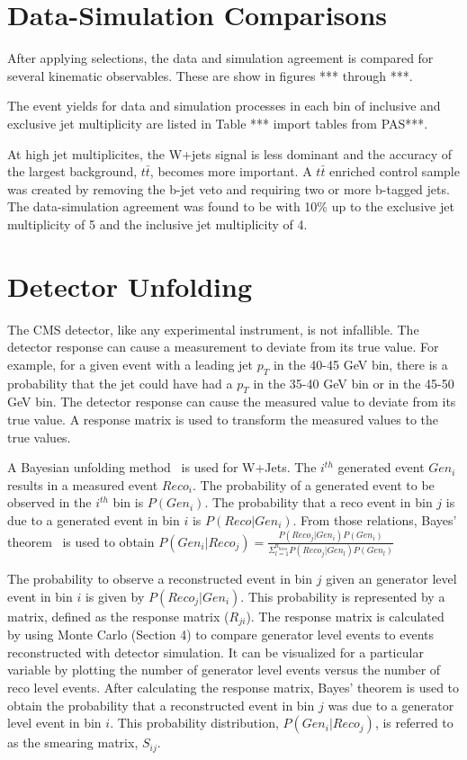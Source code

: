 \documentclass[oneside, letterpaper, oldfontcommands]{memoir}
\begin{document}
{{{\section{Data-Simulation Comparisons}
\qquad After applying selections, the data and simulation agreement is compared for several kinematic observables. These are show in figures *** through ***.

\qquad The event yields for data and simulation processes in each bin of inclusive and exclusive jet multiplicity are listed in Table *** import tables from PAS***.

\qquad At high jet multiplicites, the W+jets signal is less dominant and the accuracy of the largest background, $t\bar{t}$, becomes more important. A $t\bar{t}$ enriched control sample was created by removing the b-jet veto and requiring two or more b-tagged jets. The data-simulation agreement was found to be with 10\% up to the exclusive jet multiplicity of 5 and the inclusive jet multiplicity of 4. 

\section{Detector Unfolding}
\qquad The CMS detector, like any experimental instrument, is not infallible. The detector response can cause a measurement to deviate from its true value. For example, for a given event with a leading jet $p_{T}$ in the 40-45 GeV bin, there is a probability that the jet could have had a $p_{T}$ in the 35-40 GeV bin or in the 45-50 GeV bin. The detector response can cause the measured value to deviate from its true value. A response matrix is used to transform the measured values to the true values. 

\qquad A Bayesian unfolding method~\cite{D'Agostini199548} is used for W+Jets. The $i^{th}$ generated event $Gen_{i}$ results in a measured event $Reco_{i}$. The probability of a generated event to be observed in the $i^{th}$ bin is $P(Gen_{i})$. The probability that a reco event in bin $j$ is due to a generated event in bin $i$ is $P(Reco|Gen_{i})$. From those relations, Bayes' theorem~\cite{BevingtonRobinson200207} is used to obtain $P(Gen_{i}|Reco_{j}) = \frac{P(Reco_{j}|Gen_{i})P(Gen_{i})}{\Sigma_{l=1}^{n_{bins}}P(Reco_{j}|Gen_{l})P(Gen_{l})}$

\qquad The probability to observe a reconstructed event in bin $j$ given an generator level event in bin $i$ is given by $P(Reco_{j}|Gen_{i})$. This probability is represented by a matrix, defined as the response matrix ($R_{ji}$). The response matrix is calculated by using Monte Carlo (Section 4) to compare generator level events to events reconstructed with detector simulation. It can be visualized for a particular variable by plotting the number of generator level events versus the number of reco level events. After calculating the response matrix, Bayes' theorem is used to obtain the probability that a reconstructed event in bin $j$ was due to a generator level event in bin $i$. This probability distribution, $P(Gen_{i}|Reco_{j})$, is referred to as the smearing matrix, $S_{ij}$.

}}}
\end{document}
